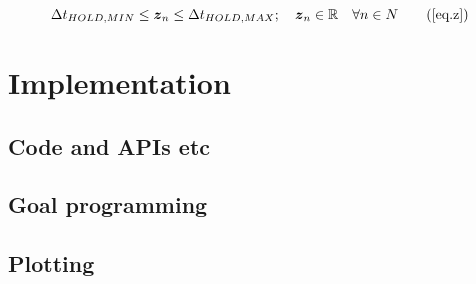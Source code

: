 \begin{equation}
    \Delta t_{HOLD,MIN} \le \boldsymbol{z}_{n} \le \Delta t_{HOLD,MAX}; \quad
    \boldsymbol{z}_{n} \in \mathbb{R} \quad \forall n \in N
    \tag{\ref{eq.z}}
\end{equation}

\section{Implementation}\label{S.implementation}

\subsection{Code and APIs etc}\label{SS.completesummary}

\subsection{Goal programming}\label{SS.completesummary}

\subsection{Plotting}\label{SS.completesummary}





